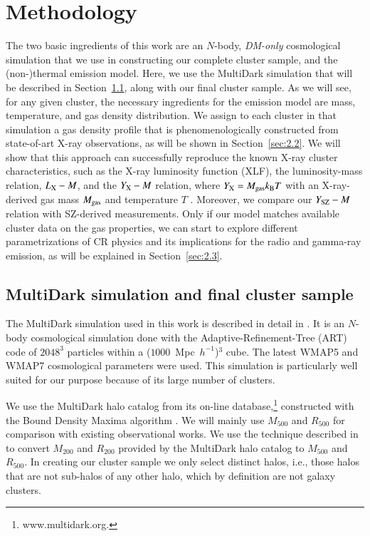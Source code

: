\documentclass[useAMS,usenatbib]{mn2e}
\begin{document}
\section{Methodology}
\label{sec:2}
The two basic ingredients of this work are an $N$-body, \emph{DM-only}
cosmological simulation that we use in constructing our complete cluster sample,
and the (non-)thermal emission model. Here, we use the MultiDark simulation that
will be described in Section~\ref{sec:2.1}, along with our final cluster
sample. As we will see, for any given cluster, the necessary ingredients for the
emission model are mass, temperature, and gas density distribution. We assign to
each cluster in that simulation a gas density profile that is phenomenologically
constructed from state-of-art X-ray observations, as will be shown in
Section~\ref{sec:2.2}. We will show that this approach can successfully
reproduce the known X-ray cluster characteristics, such as the X-ray luminosity
function (XLF), the luminosity-mass relation, $L_{{\mathrm{X}}}- M$, and the
$Y_{{\mathrm{X}}}-M$ relation, where $Y_{{\mathrm{X}}}=M_{\mathrm{gas}}k_{{\mathrm{B}}}T$ with an
X-ray-derived gas mass $M_{{\mathrm{gas}}}$ and temperature $T$
\citep{2006ApJ...650..128K}. Moreover, we compare our $Y_{{\mathrm{SZ}}}-M$ relation
with SZ-derived measurements.  Only if our model matches available cluster data
on the gas properties, we can start to explore different parametrizations of CR
physics and its implications for the radio and gamma-ray emission, as will be
explained in Section~\ref{sec:2.3}.

\subsection{MultiDark simulation and final cluster sample}
\label{sec:2.1}
The MultiDark simulation used in this work is described in detail in \cite{2011arXiv1104.5130P}.  
It is an $N$-body cosmological simulation done with
the Adaptive-Refinement-Tree (ART) code \citep{1997ApJS..111...73K} of
$2048^3$ particles within a ($1000$~Mpc~$h^{-1}$)$^3$ cube. The latest WMAP5 and
WMAP7 cosmological parameters were used. This simulation is particularly well
suited for our purpose because of its large number of clusters.
 
We use the MultiDark halo catalog from its on-line database,\footnote{www.multidark.org.} 
constructed with the Bound Density Maxima algorithm \citep{1997astro.ph.12217K}.  
We will mainly use $M_{500}$ and $R_{500}$ for comparison with existing observational works.  
We use the technique described in \cite{2003ApJ...584..702H} to convert $M_{200}$ and
$R_{200}$ provided by the MultiDark halo catalog to $M_{500}$ and $R_{500}$.  In
creating our cluster sample we only select distinct halos, i.e., those halos that
are not sub-halos of any other halo, which by definition are not galaxy clusters.
\end{document}
